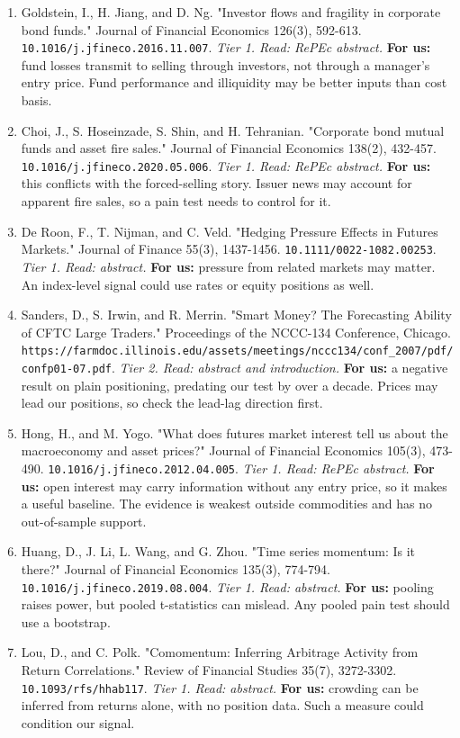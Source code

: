 \begin{enumerate}[leftmargin=*,itemsep=3pt]
\item Goldstein, I., H. Jiang, and D. Ng. "Investor flows and fragility in corporate bond funds." Journal of Financial Economics 126(3), 592-613. \nolinkurl{10.1016/j.jfineco.2016.11.007}. \emph{Tier 1. Read: RePEc abstract.} \textbf{For us:} fund losses transmit to selling through investors, not through a manager's entry price. Fund performance and illiquidity may be better inputs than cost basis.
\item Choi, J., S. Hoseinzade, S. Shin, and H. Tehranian. "Corporate bond mutual funds and asset fire sales." Journal of Financial Economics 138(2), 432-457. \nolinkurl{10.1016/j.jfineco.2020.05.006}. \emph{Tier 1. Read: RePEc abstract.} \textbf{For us:} this conflicts with the forced-selling story. Issuer news may account for apparent fire sales, so a pain test needs to control for it.
\item De Roon, F., T. Nijman, and C. Veld. "Hedging Pressure Effects in Futures Markets." Journal of Finance 55(3), 1437-1456. \nolinkurl{10.1111/0022-1082.00253}. \emph{Tier 1. Read: abstract.} \textbf{For us:} pressure from related markets may matter. An index-level signal could use rates or equity positions as well.
\item Sanders, D., S. Irwin, and R. Merrin. "Smart Money? The Forecasting Ability of CFTC Large Traders." Proceedings of the NCCC-134 Conference, Chicago. \nolinkurl{https://farmdoc.illinois.edu/assets/meetings/nccc134/conf\_2007/pdf/confp01-07.pdf}. \emph{Tier 2. Read: abstract and introduction.} \textbf{For us:} a negative result on plain positioning, predating our test by over a decade. Prices may lead our positions, so check the lead-lag direction first.
\item Hong, H., and M. Yogo. "What does futures market interest tell us about the macroeconomy and asset prices?" Journal of Financial Economics 105(3), 473-490. \nolinkurl{10.1016/j.jfineco.2012.04.005}. \emph{Tier 1. Read: RePEc abstract.} \textbf{For us:} open interest may carry information without any entry price, so it makes a useful baseline. The evidence is weakest outside commodities and has no out-of-sample support.
\item Huang, D., J. Li, L. Wang, and G. Zhou. "Time series momentum: Is it there?" Journal of Financial Economics 135(3), 774-794. \nolinkurl{10.1016/j.jfineco.2019.08.004}. \emph{Tier 1. Read: abstract.} \textbf{For us:} pooling raises power, but pooled t-statistics can mislead. Any pooled pain test should use a bootstrap.
\item Lou, D., and C. Polk. "Comomentum: Inferring Arbitrage Activity from Return Correlations." Review of Financial Studies 35(7), 3272-3302. \nolinkurl{10.1093/rfs/hhab117}. \emph{Tier 1. Read: abstract.} \textbf{For us:} crowding can be inferred from returns alone, with no position data. Such a measure could condition our signal.

\end{enumerate}
